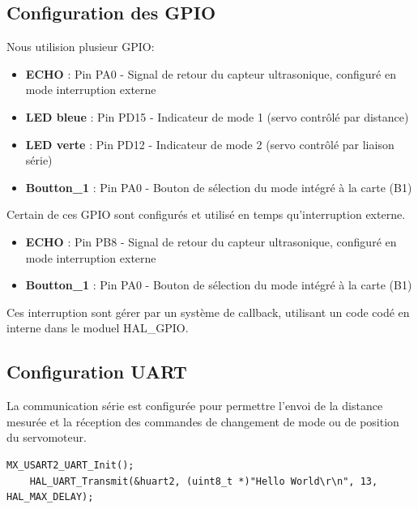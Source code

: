 \subsection{Configuration des GPIO}
    Nous utilision plusieur GPIO:

    \begin{itemize}
        \item \textbf{ECHO} : Pin PA0 - Signal de retour du capteur ultrasonique, configuré en mode interruption externe
        \item \textbf{LED bleue} : Pin PD15 - Indicateur de mode 1 (servo contrôlé par distance)
        \item \textbf{LED verte} : Pin PD12 - Indicateur de mode 2 (servo contrôlé par liaison série)
        \item \textbf{Boutton\_1} : Pin PA0 - Bouton de sélection du mode intégré à la carte (B1)
    \end{itemize}

    Certain de ces GPIO sont configurés et utilisé en temps qu'interruption externe.

    \begin{itemize}
        \item \textbf{ECHO} : Pin PB8 - Signal de retour du capteur ultrasonique, configuré en mode interruption externe
        \item \textbf{Boutton\_1} : Pin PA0 - Bouton de sélection du mode intégré à la carte (B1)
    \end{itemize}

    Ces interruption sont gérer par un système de callback, utilisant un code codé en interne dans le moduel HAL\_GPIO.

\subsection{Configuration UART}
    La communication série est configurée pour permettre l'envoi de la distance mesurée et la réception des commandes de changement de mode ou de position du servomoteur.

    \begin{lstlisting}[caption={Initialisation UART}, label={lst:uartinit}]
    MX_USART2_UART_Init();
    HAL_UART_Transmit(&huart2, (uint8_t *)"Hello World\r\n", 13, HAL_MAX_DELAY);
    \end{lstlisting}

